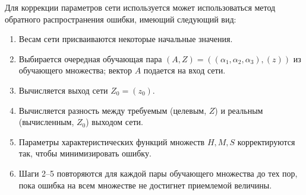 Для коррекции параметров сети используется может использоваться
метод обратного распространения ошибки, имеющий следующий вид:
\begin{enumerate}
\item Весам сети присваиваются некоторые начальные значения.
\item Выбирается очередная обучающая пара
  \( (A, Z) = ((\alpha_1, \alpha_2, \alpha_3), (z)) \)
  из обучающего множества; вектор \( A \) подается на вход сети.
\item Вычисляется выход сети \( Z_0 = (z_0) \).
\item Вычисляется разность между требуемым (целевым, \( Z \))
  и реальным (вычисленным, \( Z_0 \)) выходом сети.
\item Параметры характеристических функций множеств \( H, M, S \)
  корректируются так, чтобы минимизировать ошибку.
\item Шаги 2--5 повторяются для каждой пары обучающего множества до тех пор,
  пока ошибка на всем множестве не достигнет приемлемой величины.
\end{enumerate}
